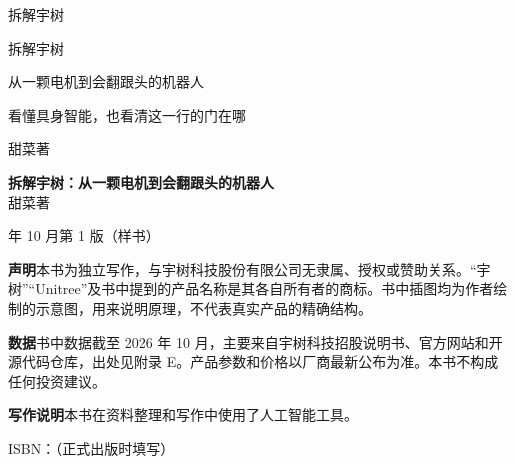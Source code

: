 \thispagestyle{empty}
\vspace*{60mm}
\begin{center}
{\heitiblack\fontsize{30}{36}\selectfont 拆解宇树}
\end{center}
\cleardoublepage

\thispagestyle{empty}
\vspace*{38mm}
\begin{center}
{\heitiblack\fontsize{40}{48}\selectfont 拆解宇树}\par
\vspace{9mm}
{\heiti\Large 从一颗电机到会翻跟头的机器人}\par
\vspace{4mm}
{\heiti\normalsize\color{mid} 看懂具身智能，也看清这一行的门在哪}\par
\vfill
{\heiti\Large 甜菜\quad 著}\par
\vspace{20mm}
\end{center}
\newpage

\thispagestyle{empty}
\vspace*{\fill}
{\small\setlength{\parskip}{1.2ex}\linespread{1.5}\selectfont
\noindent\textbf{拆解宇树：从一颗电机到会翻跟头的机器人}\\
甜菜\quad 著

 年 10 月第 1 版（样书）

\noindent\textbf{声明}\quad 本书为独立写作，与宇树科技股份有限公司无隶属、授权或赞助关系。“宇树”“Unitree”及书中提到的产品名称是其各自所有者的商标。书中插图均为作者绘制的示意图，用来说明原理，不代表真实产品的精确结构。

\noindent\textbf{数据}\quad 书中数据截至 2026 年 10 月，主要来自宇树科技招股说明书、官方网站和开源代码仓库，出处见附录 E。产品参数和价格以厂商最新公布为准。本书不构成任何投资建议。

\noindent\textbf{写作说明}\quad 本书在资料整理和写作中使用了人工智能工具。

\noindent ISBN：（正式出版时填写）
\par}
\cleardoublepage
